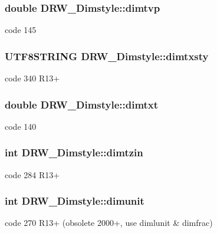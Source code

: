 \subsubsection[{dimtvp}]{\setlength{\rightskip}{0pt plus 5cm}double D\+R\+W\+\_\+\+Dimstyle\+::dimtvp}\label{class_d_r_w___dimstyle_a002065c5911ff94712dd7d688b886883}
code 145 \hypertarget{class_d_r_w___dimstyle_a864803fca4c604cf16d073a8a5bed0c2}{}
\subsubsection[{dimtxsty}]{\setlength{\rightskip}{0pt plus 5cm}U\+T\+F8\+S\+T\+R\+I\+N\+G D\+R\+W\+\_\+\+Dimstyle\+::dimtxsty}\label{class_d_r_w___dimstyle_a864803fca4c604cf16d073a8a5bed0c2}
code 340 R13+ \hypertarget{class_d_r_w___dimstyle_a8cc804b4094615949f6b314375d2e726}{}
\subsubsection[{dimtxt}]{\setlength{\rightskip}{0pt plus 5cm}double D\+R\+W\+\_\+\+Dimstyle\+::dimtxt}\label{class_d_r_w___dimstyle_a8cc804b4094615949f6b314375d2e726}
code 140 \hypertarget{class_d_r_w___dimstyle_a1c84c1ead844589af50adf72ab59d7dc}{}
\subsubsection[{dimtzin}]{\setlength{\rightskip}{0pt plus 5cm}int D\+R\+W\+\_\+\+Dimstyle\+::dimtzin}\label{class_d_r_w___dimstyle_a1c84c1ead844589af50adf72ab59d7dc}
code 284 R13+ \hypertarget{class_d_r_w___dimstyle_a6772e7086bdfff0c3c73892eb9068f90}{}
\subsubsection[{dimunit}]{\setlength{\rightskip}{0pt plus 5cm}int D\+R\+W\+\_\+\+Dimstyle\+::dimunit}\label{class_d_r_w___dimstyle_a6772e7086bdfff0c3c73892eb9068f90}
code 270 R13+ (obsolete 2000+, use dimlunit \& dimfrac) \hypertarget{class_d_r_w___dimstyle_ada5b945b12f79ebe3246b9b4830eab68}{}
